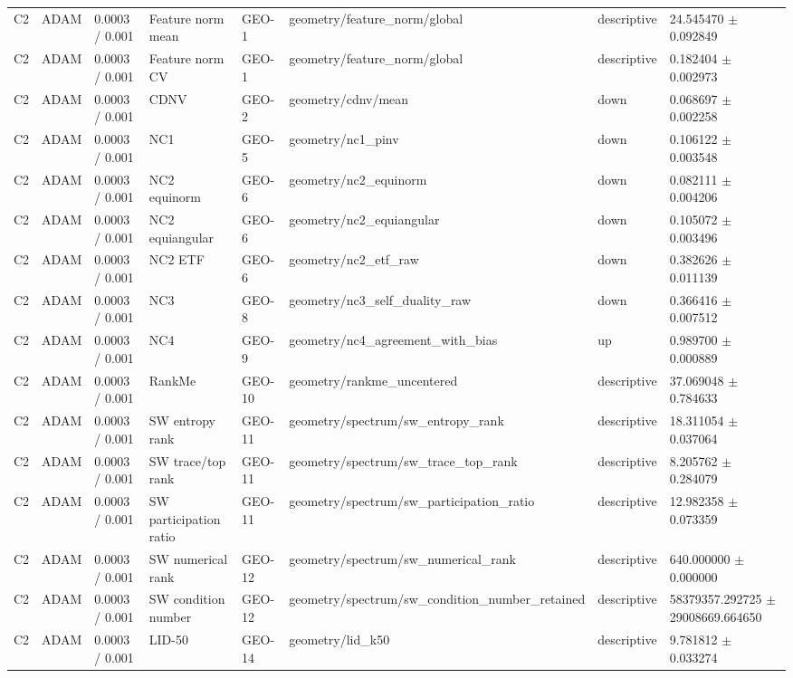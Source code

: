 \begin{longtable}{llllllll}
C2 & ADAM & 0.0003 / 0.001 & Feature norm mean & GEO-1 & geometry/feature\_norm/global & descriptive & 24.545470 $\pm$ 0.092849 \\
C2 & ADAM & 0.0003 / 0.001 & Feature norm CV & GEO-1 & geometry/feature\_norm/global & descriptive & 0.182404 $\pm$ 0.002973 \\
C2 & ADAM & 0.0003 / 0.001 & CDNV & GEO-2 & geometry/cdnv/mean & down & 0.068697 $\pm$ 0.002258 \\
C2 & ADAM & 0.0003 / 0.001 & NC1 & GEO-5 & geometry/nc1\_pinv & down & 0.106122 $\pm$ 0.003548 \\
C2 & ADAM & 0.0003 / 0.001 & NC2 equinorm & GEO-6 & geometry/nc2\_equinorm & down & 0.082111 $\pm$ 0.004206 \\
C2 & ADAM & 0.0003 / 0.001 & NC2 equiangular & GEO-6 & geometry/nc2\_equiangular & down & 0.105072 $\pm$ 0.003496 \\
C2 & ADAM & 0.0003 / 0.001 & NC2 ETF & GEO-6 & geometry/nc2\_etf\_raw & down & 0.382626 $\pm$ 0.011139 \\
C2 & ADAM & 0.0003 / 0.001 & NC3 & GEO-8 & geometry/nc3\_self\_duality\_raw & down & 0.366416 $\pm$ 0.007512 \\
C2 & ADAM & 0.0003 / 0.001 & NC4 & GEO-9 & geometry/nc4\_agreement\_with\_bias & up & 0.989700 $\pm$ 0.000889 \\
C2 & ADAM & 0.0003 / 0.001 & RankMe & GEO-10 & geometry/rankme\_uncentered & descriptive & 37.069048 $\pm$ 0.784633 \\
C2 & ADAM & 0.0003 / 0.001 & SW entropy rank & GEO-11 & geometry/spectrum/sw\_entropy\_rank & descriptive & 18.311054 $\pm$ 0.037064 \\
C2 & ADAM & 0.0003 / 0.001 & SW trace/top rank & GEO-11 & geometry/spectrum/sw\_trace\_top\_rank & descriptive & 8.205762 $\pm$ 0.284079 \\
C2 & ADAM & 0.0003 / 0.001 & SW participation ratio & GEO-11 & geometry/spectrum/sw\_participation\_ratio & descriptive & 12.982358 $\pm$ 0.073359 \\
C2 & ADAM & 0.0003 / 0.001 & SW numerical rank & GEO-12 & geometry/spectrum/sw\_numerical\_rank & descriptive & 640.000000 $\pm$ 0.000000 \\
C2 & ADAM & 0.0003 / 0.001 & SW condition number & GEO-12 & geometry/spectrum/sw\_condition\_number\_retained & descriptive & 58379357.292725 $\pm$ 29008669.664650 \\
C2 & ADAM & 0.0003 / 0.001 & LID-50 & GEO-14 & geometry/lid\_k50 & descriptive & 9.781812 $\pm$ 0.033274 \\

\end{longtable}
